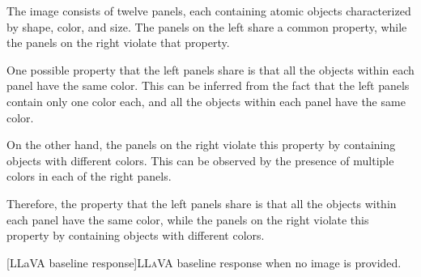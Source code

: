 \begin{tcolorbox}[breakable,enhanced jigsaw,opacityback=0,]
	\centering
	\footnotesize
	\begin{dialogue}
		 The image consists of twelve panels, each containing atomic objects characterized by shape, color, and size. The panels on the left share a common property, while the panels on the right violate that property.
		
		One possible property that the left panels share is that all the objects within each panel have the same color. This can be inferred from the fact that the left panels contain only one color each, and all the objects within each panel have the same color.
		
		On the other hand, the panels on the right violate this property by containing objects with different colors. This can be observed by the presence of multiple colors in each of the right panels.
		
		Therefore, the property that the left panels share is that all the objects within each panel have the same color, while the panels on the right violate this property by containing objects with different colors.
		
		
		
		
		
	\end{dialogue}
\end{tcolorbox}
\noindent\begin{minipage}{\textwidth}
	[LLaVA baseline response]{\textsc{LLaVA} baseline response when no image is provided.}\label{kandy:fig:baseline}
\end{minipage}
